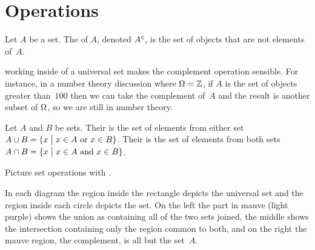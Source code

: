 \documentclass{ibl}  %
\begin{document}
\section{Operations}

\begin{df}
Let $A$ be a set.
The  of $A$, denoted ${A}^{\mspace{1mu}\mathsf{c}}$, is the 
set of objects that are not elements of~$A$.  
\end{df}

\noindent\remark
working inside of a universal set makes the complement
operation sensible. 
For instance, in a number theory discussion where $\Omega=\mathbb{Z}$, 
if $A$ is the set of objects greater than~$100$ then we can
take the complement of~$A$ and the result is another subset of 
$\Omega$, so 
we are still in number theory.

\begin{df}
Let $A$ and $B$ be sets.
Their  is the set of elements 
from either set 
$A\cup B=\{x \bigm| \text{$x\in A$ or $x\in B$}\}$.  
Their  is the set of elements 
from both sets
$A\cap B=\{x \bigm| \text{$x\in A$ and $x\in B$}\}$.  
\end{df}

Picture set operations with .
\begin{center}
  \hspace*{3em}
  \hspace*{3em}
\end{center}
In each diagram
the region inside the rectangle depicts the universal set and the 
region inside each circle depicts the set.
On the left the part in mauve (light purple) shows 
the union as containing all of the two sets joined, 
the middle shows the intersection
containing only the region common to both,
and on the right the mauve region, the complement, is all but the set~$A$.
\end{document}
